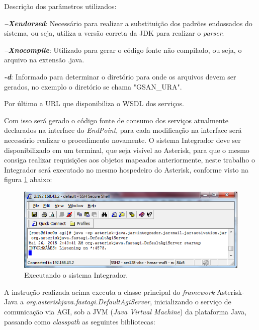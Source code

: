 Descrição dos parâmetros utilizados:

\begin{description}
	\item \textbf{\textit{–Xendorsed}}: Necessário para realizar a substituição dos padrões endossados do sistema, ou seja, utiliza a versão correta da JDK para realizar o \textit{parser}.
	\item \textbf{\textit{–Xnocompile}}: Utilizado para gerar o código fonte não compilado, ou seja, o arquivo na extensão .java.
	\item \textbf{\textit{-d}}: Informado para determinar o diretório para onde os arquivos devem ser gerados, no exemplo o diretório se chama "GSAN\_URA".
	\item Por último a URL que disponibiliza o WSDL dos serviços. 
\end{description}



Com isso será gerado o código fonte de consumo dos serviços atualmente declarados na interface do \textit{EndPoint}, para cada modificação na interface será necessário realizar o procedimento novamente. O sistema Integrador deve ser disponibilizado em um terminal, que seja visível ao Asterisk, para que o mesmo consiga realizar requisições aos objetos mapeados anteriormente, neste trabalho o Integrador será executado no mesmo hospedeiro do Asterisk, conforme visto na figura \ref{figura:executarIntegrador} abaixo:

\begin{figure}[H]
	\centering
	\caption{Executando o sistema Integrador.}	
	\label{figura:executarIntegrador}
	\includegraphics{figuras/executar_integrador.png}
\end{figure}


A instrução realizada acima executa a classe principal do \textit{framework} Asterisk-Java a \textit{ org.asteriskjava.fastagi.DefaultAgiServer}, inicializando o serviço de comunicação via AGI, sob a JVM (\textit{Java Virtual Machine}) da plataforma Java, passando como \textit{classpath} as seguintes bibliotecas: 

